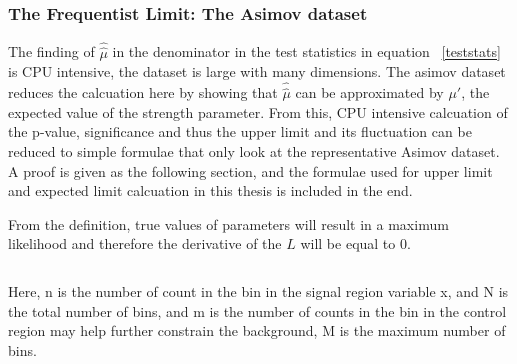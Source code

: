 %
%
%
%





\subsubsection{The Frequentist Limit: The Asimov dataset}
\label{sec:asimov}

The finding of $\hat{\hat{\mu}}$ in the denominator in the test statistics in equation ~\ref{teststats} is CPU intensive, the dataset is large with many dimensions. The asimov dataset reduces the calcuation here by showing that $\hat{\hat{\mu}}$ can be approximated by $\mu'$, the expected value of the strength parameter. From this, CPU intensive calcuation of the p-value, significance and thus the upper limit and its fluctuation can be reduced to simple formulae that only look at the representative Asimov dataset. 
A proof is given as the following section, and the formulae used for upper limit and expected limit calcuation in this thesis is included in the end. 

From the definition, true values of parameters will result in a maximum likelihood and therefore the derivative of the ${L}$ will be equal to 0. 

\begin{equation}
\end{equation}

Here, n is the number of count in the bin in the signal region variable x, and N is the total number of bins, and m is the number of counts in the bin in the control region may help further constrain the background, M is the maximum number of bins. 

